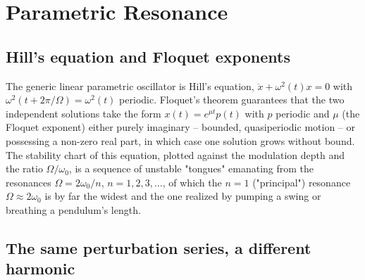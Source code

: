 \documentclass[11pt]{book}
\begin{document}
\section{Parametric Resonance}
\label{sec:paramres}

\subsection{Hill's equation and Floquet exponents}

The generic linear parametric oscillator is Hill's equation, $\ddot x + \omega^2(t)x = 0$ with
$\omega^2(t+2\pi/\Omega) = \omega^2(t)$ periodic. Floquet's theorem guarantees that the two
independent solutions take the form $x(t) = e^{\mu t}p(t)$ with $p$ periodic and $\mu$ (the Floquet
exponent) either purely imaginary -- bounded, quasiperiodic motion -- or possessing a non-zero real
part, in which case one solution grows without bound. The stability chart of this equation, plotted
against the modulation depth and the ratio $\Omega/\omega_0$, is a sequence of unstable "tongues"
emanating from the resonances $\Omega = 2\omega_0/n$, $n=1,2,3,\dots$, of which the $n=1$
("principal") resonance $\Omega\approx 2\omega_0$ is by far the widest and the one realized by
pumping a swing or breathing a pendulum's length.

\subsection{The same perturbation series, a different harmonic}
\end{document}

